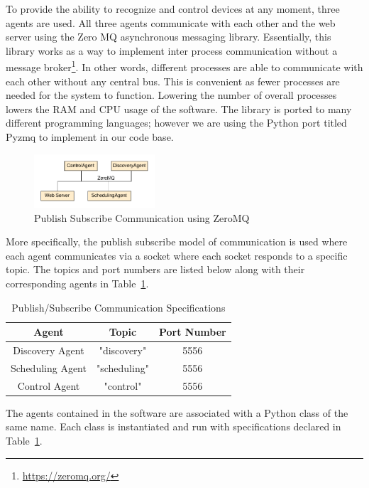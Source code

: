\documentclass[conference]{IEEEtran}
\begin{document}
To provide the ability to recognize and control devices at any moment, three agents are used. All three agents communicate with each other and the web server using the Zero MQ asynchronous messaging library. Essentially, this library works as a way to implement inter process communication without a message
broker\footnote{\href{https://zeromq.org/}{https://zeromq.org/}}. In other words, different processes are able to communicate with each
other without any central bus. This is convenient as fewer processes are needed for the system to function. Lowering the number of overall processes lowers the
RAM and CPU usage of the software. The library is ported to many different programming languages; however we are using the Python port titled Pyzmq to
implement in our code base.
%
\begin{figure}[htbp]
    \centering
    \includegraphics[width=0.4\textwidth]{figs/agents/pubSubAgents.pdf}
    \caption{Publish Subscribe Communication using ZeroMQ}
    \label{fig:pubSubAgents}
\end{figure}

More specifically, the publish subscribe model of communication is used where
each agent communicates via a socket where each socket responds to a specific
topic. The topics and port numbers are listed below along with their
corresponding agents in Table~\ref{tab:pubsubspecs}. %
%
\begin{table}[htbp]
    \centering
    \begin{tabular}{|c|c|c|}
        \hline
        Agent & Topic & Port Number\\
        \hline
        Discovery Agent & "discovery" & 5556\\
        Scheduling Agent & "scheduling" & 5556\\
        Control Agent & "control" & 5556\\
        \hline
    \end{tabular}
    \caption{Publish/Subscribe Communication Specifications}
    \label{tab:pubsubspecs}
\end{table}
The agents contained in the software are associated with a Python class of the
same name. Each class is instantiated and run with specifications declared in
Table~\ref{tab:pubsubspecs}. 
\end{document}
